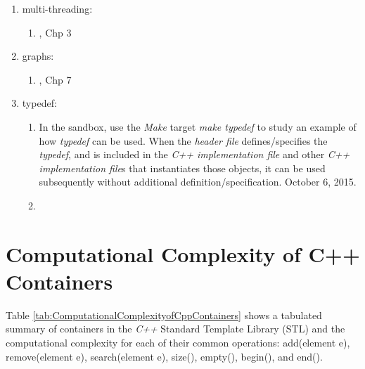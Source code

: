 \begin{enumerate}
\begin{enumerate}
		\begin{enumerate} \itemsep -2pt
		\item \cite[\S14.2]{Scheinerman2006}
		\end{enumerate}
	\end{enumerate}
\item multi-threading: \vspace{-0.3cm}
	\begin{enumerate} \itemsep -2pt
	\item \cite{Schildt2004a}, Chp 3
	\end{enumerate}
\item graphs: \vspace{-0.3cm}
	\begin{enumerate} \itemsep -2pt
	\item \cite{Schildt2004a}, Chp 7
	\end{enumerate}
\item typedef: \vspace{-0.3cm}
	\begin{enumerate} \itemsep -2pt
	\item In the sandbox, use the {\it Make} target {\it make typedef} to study an example of how {\it typedef} can be used. When the {\it header file} defines/specifies the {\it typedef}, and is included in the {\it C++ implementation file} and other {\it C++ implementation file}s that instantiates those objects, it can be used subsequently without additional definition/specification. October 6, 2015.
	\item \cite[pp. 510-512]{Savitch2009}
	\end{enumerate}
\end{enumerate}







\section{Computational Complexity of C++ Containers}
\label{sec:ComputationalComplexityofCppContainers}


	Table \ref{tab:ComputationalComplexityofCppContainers} shows a tabulated summary of containers in the {\it C++} Standard Template Library (STL) and the computational complexity for each of their common operations: add(element e), remove(element e), search(element e), size(), empty(), begin(), and end(). \\

